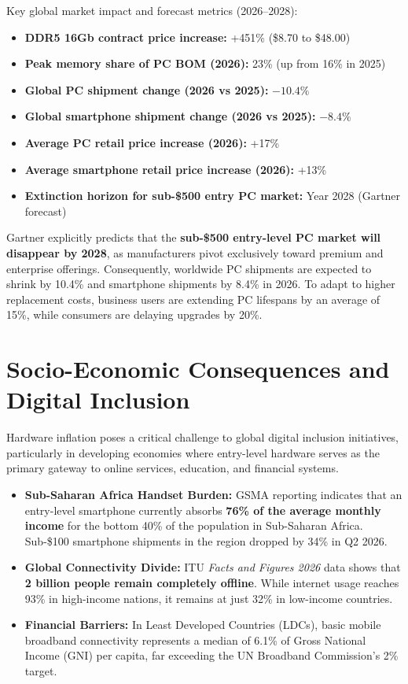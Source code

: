 \documentclass[11pt,a4paper]{article}
\begin{document}
Key global market impact and forecast metrics (2026--2028):
\begin{itemize}
  \item \textbf{DDR5 16Gb contract price increase:} +451\% (\$8.70 to \$48.00)
  \item \textbf{Peak memory share of PC BOM (2026):} 23\% (up from 16\% in
        2025)
  \item \textbf{Global PC shipment change (2026 vs 2025):} $-10.4\%$
  \item \textbf{Global smartphone shipment change (2026 vs 2025):} $-8.4\%$
  \item \textbf{Average PC retail price increase (2026):} +17\%
  \item \textbf{Average smartphone retail price increase (2026):} +13\%
  \item \textbf{Extinction horizon for sub-\$500 entry PC market:} Year 2028
        (Gartner forecast)
\end{itemize}

Gartner explicitly predicts that the \textbf{sub-\$500 entry-level PC market
will disappear by 2028}, as manufacturers pivot exclusively toward premium and
enterprise offerings. Consequently, worldwide PC shipments are expected to
shrink by 10.4\% and smartphone shipments by 8.4\% in 2026. To adapt to higher
replacement costs, business users are extending PC lifespans by an average of
15\%, while consumers are delaying upgrades by 20\%.

\section{Socio-Economic Consequences and Digital Inclusion}
Hardware inflation poses a critical challenge to global digital inclusion
initiatives, particularly in developing economies where entry-level hardware
serves as the primary gateway to online services, education, and financial
systems.
\begin{itemize}
  \item \textbf{Sub-Saharan Africa Handset Burden:} GSMA reporting indicates
        that an entry-level smartphone currently absorbs \textbf{76\% of the
        average monthly income} for the bottom 40\% of the population in
        Sub-Saharan Africa. Sub-\$100 smartphone shipments in the region
        dropped by 34\% in Q2 2026.
  \item \textbf{Global Connectivity Divide:} ITU \textit{Facts and Figures
        2026} data shows that \textbf{2 billion people remain completely
        offline}. While internet usage reaches 93\% in high-income nations, it
        remains at just 32\% in low-income countries.
  \item \textbf{Financial Barriers:} In Least Developed Countries (LDCs),
        basic mobile broadband connectivity represents a median of 6.1\% of
        Gross National Income (GNI) per capita, far exceeding the UN Broadband
        Commission's 2\% target.
\end{itemize}
\end{document}

